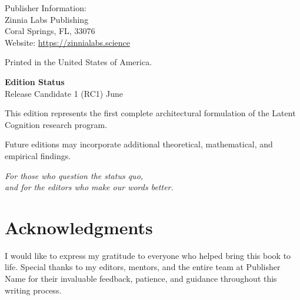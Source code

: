 \vspace{0.2in}
\noindent Publisher Information: \\

Zinnia Labs Publishing \\

Coral Springs, FL, 33076 \\

Website: \href{}{https://zinnialabs.science} 

\vspace{0.2in}
\noindent Printed in the United States of America.
\newpage

\thispagestyle{empty}
\null
\vfill

\noindent \textbf{Edition Status} \\
Release Candidate 1 (RC1)  June \the\year{} 

\vspace{0.2in}
\noindent This edition represents the first complete architectural formulation of the Latent Cognition research program.     

\vspace{\baselineskip}   

Future editions may incorporate additional
theoretical, mathematical, and empirical findings.

\newpage

\thispagestyle{empty}
\vspace*{2in}
\begin{center}
    \itshape
    For those who question the status quo, \\
    and for the editors who make our words better.
\end{center}

\vspace{1.5in}
\section*{Acknowledgments}
\noindent I would like to express my gratitude to everyone who helped bring this book to life. Special thanks to my editors, mentors, and the entire team at Publisher Name for their invaluable feedback, patience, and guidance throughout this writing process.

\newpage
